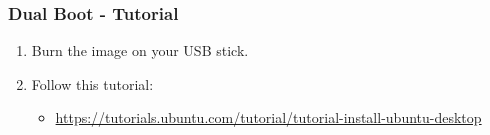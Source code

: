 \begin{frame}
	\frametitle{Dual Boot - Tutorial}

	\begin{enumerate}
		\item Burn the image on your USB stick.
		\item Follow this tutorial:
		\begin{itemize}
			\item \url{https://tutorials.ubuntu.com/tutorial/tutorial-install-ubuntu-desktop}
		\end{itemize}
	\end{enumerate}

\end{frame}


